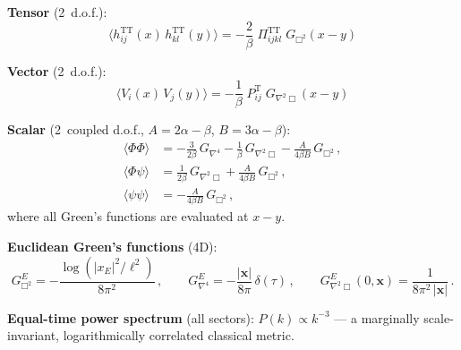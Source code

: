 \documentclass[11pt,a4paper]{article}
\newcommand{\TT}{\mathrm{TT}}
\theoremstyle{definition}
\theoremstyle{remark}
\begin{document}
\noindent\textbf{Tensor} (2~d.o.f.):
\begin{equation*}
  \bigl\langle h^\TT_{ij}(x)\, h^\TT_{kl}(y)\bigr\rangle
  = -\frac{2}{\beta}\;\Pi^\TT_{ijkl}\;G_{\Box^2}(x-y)
\end{equation*}

\noindent\textbf{Vector} (2~d.o.f.):
\begin{equation*}
  \bigl\langle V_i(x)\, V_j(y)\bigr\rangle
  = -\frac{1}{\beta}\;P^\mathrm{T}_{ij}\;G_{\nabla^2\Box}(x-y)
\end{equation*}

\noindent\textbf{Scalar} (2~coupled d.o.f., $A = 2\alpha-\beta$,
$B = 3\alpha-\beta$):
\begin{equation*}
  \begin{aligned}
  \langle\Phi\Phi\rangle
  &= -\tfrac{3}{2\beta}\,G_{\nabla^4}
   - \tfrac{1}{\beta}\,G_{\nabla^2\Box}
   - \tfrac{A}{4\beta B}\,G_{\Box^2}\,,\\[4pt]
  \langle\Phi\psi\rangle
  &= \tfrac{1}{2\beta}\,G_{\nabla^2\Box}
   + \tfrac{A}{4\beta B}\,G_{\Box^2}\,,\\[4pt]
  \langle\psi\psi\rangle
  &= -\tfrac{A}{4\beta B}\,G_{\Box^2}\,,
  \end{aligned}
\end{equation*}
where all Green's functions are evaluated at $x-y$.

\medskip
\noindent\textbf{Euclidean Green's functions} (4D):
\begin{equation*}
  G_{\Box^2}^E = -\frac{\log(|x_E|^2/\ell^2)}{8\pi^2}\,,\qquad
  G_{\nabla^4}^E = -\frac{|\mathbf{x}|}{8\pi}\,\delta(\tau)\,,\qquad
  G_{\nabla^2\Box}^E(0,\mathbf{x}) = \frac{1}{8\pi^2\,|\mathbf{x}|}\,.
\end{equation*}

\noindent\textbf{Equal-time power spectrum} (all sectors):
$P(k) \propto k^{-3}$ --- a marginally scale-invariant, logarithmically
correlated classical metric.
\end{document}
